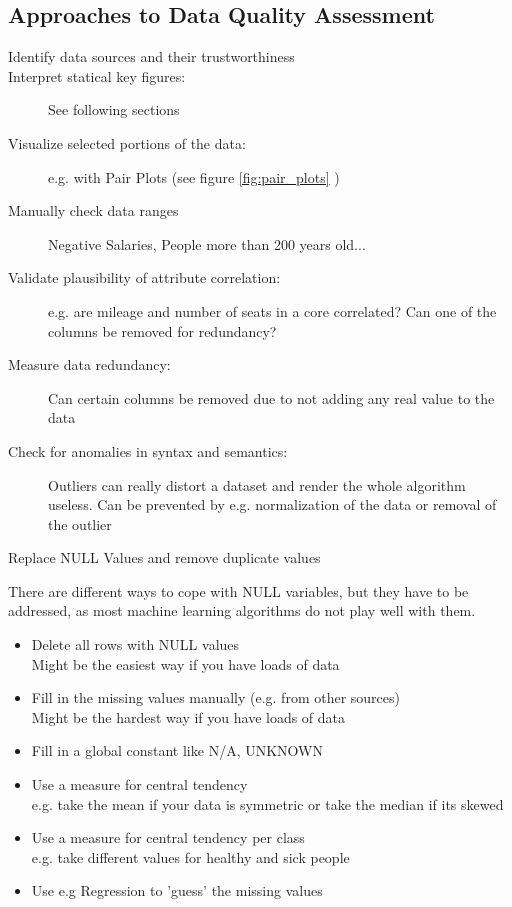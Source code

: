 \documentclass[11pt]{article}
\begin{document}
\subsection{Approaches to Data Quality Assessment}

\begin{description}
    \item[Identify data sources and their trustworthiness]
    \item[Interpret statical key figures: ] See following sections
    \item[Visualize selected portions of the data: ] e.g. with Pair Plots (see figure \ref{fig:pair_plots} )
    \item[Manually check data ranges] Negative Salaries, People more than 200 years old...
    \item[Validate plausibility of attribute correlation: ] e.g. are mileage and number of seats in a core correlated? Can one of the columns be removed for redundancy?
    \item[Measure data redundancy: ] Can certain columns be removed due to not adding any real value to the data
    \item[Check for anomalies in syntax and semantics: ] Outliers can really distort a dataset and render the whole algorithm useless. Can be prevented by e.g. normalization of the data or removal of the outlier
    \item[Replace NULL Values and remove duplicate values]
\end{description}

There are different ways to cope with NULL variables, but they have to be addressed, as most machine learning algorithms do not play well with them.

\begin{itemize}
    \item Delete all rows with NULL values \\
          Might be the easiest way if you have loads of data
    \item Fill in the missing values manually (e.g. from other sources) \\
          Might be the hardest way if you have loads of data
    \item Fill in a global constant like N/A, UNKNOWN
    \item Use a measure for central tendency \\
          e.g. take the mean if your data is symmetric or take the median if its skewed
    \item Use a measure for central tendency per class \\
          e.g. take different values for healthy and sick people
    \item Use e.g Regression to 'guess' the missing values
\end{itemize}
\end{document}
